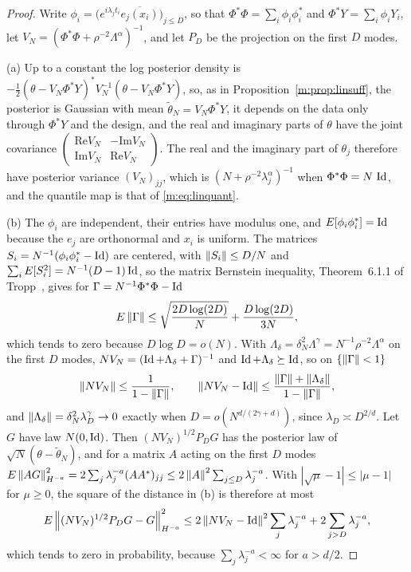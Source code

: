 \begin{proof}
Write $\phi_i=\big(e^{i\lambda_jt_i}\overline{e_j(x_i)}\big)_{j\le D}$, so that $\Phi^*\Phi=\sum_i\phi_i\phi_i^*$ and $\Phi^*Y=\sum_i\phi_iY_i$, let $V_N=(\Phi^*\Phi+\rho^{-2}\Lambda^\alpha)^{-1}$, and let $P_D$ be the projection on the first $D$ modes.

(a) Up to a constant the log posterior density is $-\frac12(\theta-V_N\Phi^*Y)^*V_N^{-1}(\theta-V_N\Phi^*Y)$, so, as in Proposition~\ref{m:prop:linsuff}, the posterior is Gaussian with mean $\tilde\theta_N=V_N\Phi^*Y$, it depends on the data only through $\Phi^*Y$ and the design, and the real and imaginary parts of $\theta$ have the joint covariance $\left(\begin{smallmatrix}\mathrm{Re}V_N&-\mathrm{Im}V_N\\\mathrm{Im}V_N&\mathrm{Re}V_N\end{smallmatrix}\right)$. The real and the imaginary part of $\theta_j$ therefore have posterior variance $(V_N)_{jj}$, which is $(N+\rho^{-2}\lambda_j^\alpha)^{-1}$ when $\Phi^*\Phi=N\,\operatorname{Id}$, and the quantile map is that of \eqref{m:eq:linquant}.

(b) The $\phi_i$ are independent, their entries have modulus one, and $E[\phi_i\phi_i^*]=\operatorname{Id}$ because the $e_j$ are orthonormal and $x_i$ is uniform. The matrices $S_i=N^{-1}(\phi_i\phi_i^*-\operatorname{Id})$ are centered, with $\left\|S_i\right\|\le D/N$ and $\sum_iE[S_i^2]=N^{-1}(D-1)\operatorname{Id}$, so the matrix Bernstein inequality, Theorem~6.1.1 of Tropp~\cite{tropp2015}, gives for $\Gamma=N^{-1}\Phi^*\Phi-\operatorname{Id}$
\[
E\left\|\Gamma\right\|\le\sqrt{\frac{2D\log(2D)}N}+\frac{D\log(2D)}{3N},
\]
which tends to zero because $D\log D=o(N)$. With $\Lambda_\delta=\delta_N^2\Lambda^\gamma=N^{-1}\rho^{-2}\Lambda^\alpha$ on the first $D$ modes, $NV_N=(\operatorname{Id}+\Lambda_\delta+\Gamma)^{-1}$ and $\operatorname{Id}+\Lambda_\delta\succeq\operatorname{Id}$, so on $\{\left\|\Gamma\right\|<1\}$
\[
\left\|NV_N\right\|\le\frac1{1-\left\|\Gamma\right\|},\qquad\left\|NV_N-\operatorname{Id}\right\|\le\frac{\left\|\Gamma\right\|+\left\|\Lambda_\delta\right\|}{1-\left\|\Gamma\right\|},
\]
and $\left\|\Lambda_\delta\right\|=\delta_N^2\lambda_D^\gamma\to0$ exactly when $D=o(N^{d/(2\gamma+d)})$, since $\lambda_D\asymp D^{2/d}$. Let $G$ have law $N(0,\operatorname{Id})$. Then $(NV_N)^{1/2}P_DG$ has the posterior law of $\sqrt N(\theta-\tilde\theta_N)$, and for a matrix $A$ acting on the first $D$ modes $E\left\|AG\right\|^2_{H^{-a}}=2\sum_j\lambda_j^{-a}(AA^*)_{jj}\le2\left\|A\right\|^2\sum_{j\le D}\lambda_j^{-a}$. With $|\sqrt\mu-1|\le|\mu-1|$ for $\mu\ge0$, the square of the distance in (b) is therefore at most
\[
E\left\|(NV_N)^{1/2}P_DG-G\right\|^2_{H^{-a}}\le2\left\|NV_N-\operatorname{Id}\right\|^2\sum_j\lambda_j^{-a}+2\sum_{j>D}\lambda_j^{-a},
\]
which tends to zero in probability, because $\sum_j\lambda_j^{-a}<\infty$ for $a>d/2$.


\end{proof}
